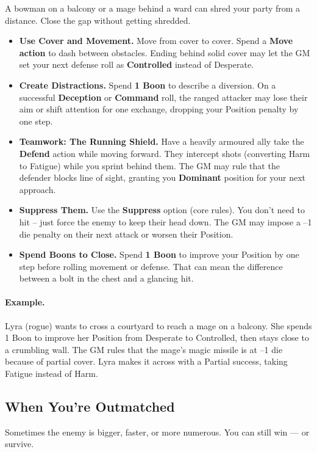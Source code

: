 A bowman on a balcony or a mage behind a ward can shred your party from a distance. Close the gap without getting shredded.

\begin{itemize}
  \item \textbf{Use Cover and Movement.} Move from cover to cover. Spend a \textbf{Move action} to dash between obstacles. Ending behind solid cover may let the GM set your next defense roll as \textbf{Controlled} instead of Desperate.
  \item \textbf{Create Distractions.} Spend \textbf{1 Boon} to describe a diversion. On a successful \textbf{Deception} or \textbf{Command} roll, the ranged attacker may lose their aim or shift attention for one exchange, dropping your Position penalty by one step.
  \item \textbf{Teamwork: The Running Shield.} Have a heavily armoured ally take the \textbf{Defend} action while moving forward. They intercept shots (converting Harm to Fatigue) while you sprint behind them. The GM may rule that the defender blocks line of sight, granting you \textbf{Dominant} position for your next approach.
  \item \textbf{Suppress Them.} Use the \textbf{Suppress} option (core rules). You don’t need to hit – just force the enemy to keep their head down. The GM may impose a –1 die penalty on their next attack or worsen their Position.
  \item \textbf{Spend Boons to Close.} Spend \textbf{1 Boon} to improve your Position by one step before rolling movement or defense. That can mean the difference between a bolt in the chest and a glancing hit.
\end{itemize}

\paragraph{Example.}
Lyra (rogue) wants to cross a courtyard to reach a mage on a balcony. She spends 1 Boon to improve her Position from Desperate to Controlled, then stays close to a crumbling wall. The GM rules that the mage’s magic missile is at –1 die because of partial cover. Lyra makes it across with a Partial success, taking Fatigue instead of Harm.

\subsection{When You’re Outmatched}

Sometimes the enemy is bigger, faster, or more numerous. You can still win — or survive.

